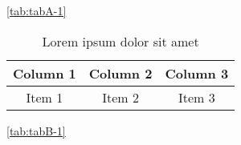 \lipsum[1-1] \ref{tab:tabA-1}

\begin{table}[ht!]
    \centering
    \begin{tabular}{c c c}
        \hline
        Column 1 & Column 2 & Column 3 \\
        \hline
        Item 1   & Item 2   & Item 3   \\
    \end{tabular}
    \caption{Lorem ipsum dolor sit amet}
    \label{tab:tabB-3}
\end{table}

\lipsum[1-1] \ref{tab:tabB-1}

\lipsum[1-2]
